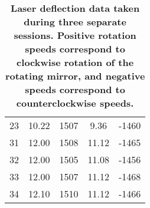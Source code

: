 \documentclass[twocolumn]{article}
\begin{document}
\begin{table*}[t]
\begin{tabular}{|c|c|c|c|c|}
				23       & 10.22                                                          & 1507                                                        & 9.36                                                            & -1460                                                        \\
				31       & 12.00                                                          & 1508                                                        & 11.12                                                           & -1465                                                        \\
				32       & 12.00                                                          & 1505                                                        & 11.08                                                           & -1456                                                        \\
				33       & 12.00                                                          & 1507                                                        & 11.12                                                           & -1468                                                        \\
				34       & 12.10                                                          & 1510                                                        & 11.12                                                           & -1466  \\ \hline                                                     
			\end{tabular}
			\caption{\textbf{Laser deflection data taken during three separate sessions. Positive rotation speeds correspond to clockwise rotation of the rotating mirror, and negative speeds correspond to counterclockwise speeds.}}
			\label{tab:rawmeasure}
		\end{table*}
		
\end{document}

